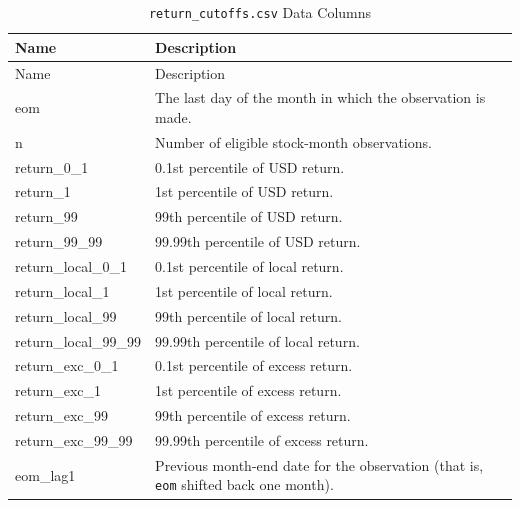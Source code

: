 \documentclass[12pt,title,fleqn]{article}
\begin{document}
{\scriptsize
	\begin{longtable}{@{\extracolsep{\fill}}|l|m{14.2cm}|@{}}
	\caption{\texttt{return\_cutoffs.csv} Data Columns \label{return-cutoffs}}\\
	
	\hline
	Name & Description \\
	\hline
	\endfirsthead
	
	\hline
	Name & Description \\
	\hline
	\endhead
	
	\hline
	\endfoot
	
	
	\hline\hline
	\endlastfoot
    
    eom\rule{0pt}{10pt} & The last day of the month in which the observation is made. \\[1ex]

    n & Number of eligible stock-month observations. \\[1ex]

    return\_0\_1 & 0.1st percentile of USD return. \\[1ex]

    return\_1 & 1st percentile of USD return. \\[1ex]
    
    return\_99 & 99th percentile of USD return. \\[1ex]

    return\_99\_99 & 99.99th percentile of USD return. \\[1ex]

    return\_local\_0\_1 & 0.1st percentile of local return. \\[1ex]

    return\_local\_1 & 1st percentile of local return. \\[1ex]
    
    return\_local\_99 & 99th percentile of local return. \\[1ex]

    return\_local\_99\_99 & 99.99th percentile of local return. \\[1ex]

    return\_exc\_0\_1 & 0.1st percentile of excess return. \\[1ex]

    return\_exc\_1 & 1st percentile of excess return. \\[1ex]
    
    return\_exc\_99 & 99th percentile of excess return. \\[1ex]

    return\_exc\_99\_99 & 99.99th percentile of excess return. \\[1ex]

    eom\_lag1 & Previous month-end date for the observation (that is, \texttt{eom} shifted back one month). \\[1ex]

\end{longtable}}
\end{document}
